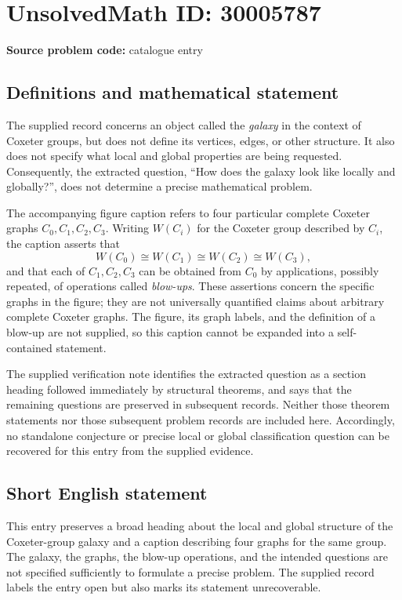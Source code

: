 \documentclass[11pt]{article}
\begin{document}
\section*{UnsolvedMath ID: 30005787}
\textbf{Source problem code:} catalogue entry
\subsection{Definitions and mathematical statement}
The supplied record concerns an object called the \emph{galaxy} in the context of Coxeter groups, but does not define its vertices, edges, or other structure. It also does not specify what local and global properties are being requested. Consequently, the extracted question, ``How does the galaxy look like locally and globally?'', does not determine a precise mathematical problem.

The accompanying figure caption refers to four particular complete Coxeter graphs \(C_0,C_1,C_2,C_3\). Writing \(W(C_i)\) for the Coxeter group described by \(C_i\), the caption asserts that
\[
W(C_0)\cong W(C_1)\cong W(C_2)\cong W(C_3),
\]
and that each of \(C_1,C_2,C_3\) can be obtained from \(C_0\) by applications, possibly repeated, of operations called \emph{blow-ups}. These assertions concern the specific graphs in the figure; they are not universally quantified claims about arbitrary complete Coxeter graphs. The figure, its graph labels, and the definition of a blow-up are not supplied, so this caption cannot be expanded into a self-contained statement.

The supplied verification note identifies the extracted question as a section heading followed immediately by structural theorems, and says that the remaining questions are preserved in subsequent records. Neither those theorem statements nor those subsequent problem records are included here. Accordingly, no standalone conjecture or precise local or global classification question can be recovered for this entry from the supplied evidence.
\subsection{Short English statement}
This entry preserves a broad heading about the local and global structure of the Coxeter-group galaxy and a caption describing four graphs for the same group. The galaxy, the graphs, the blow-up operations, and the intended questions are not specified sufficiently to formulate a precise problem. The supplied record labels the entry open but also marks its statement unrecoverable.
\end{document}
